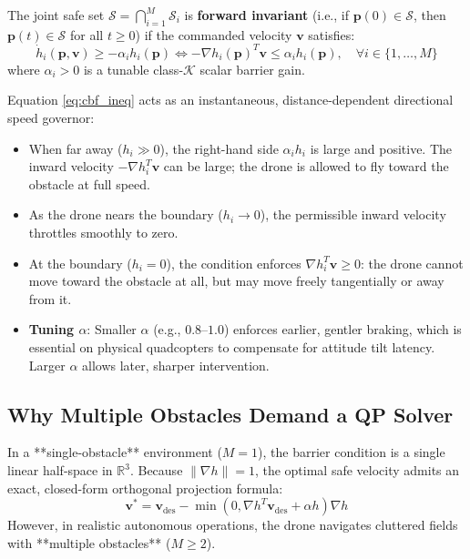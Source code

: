 \documentclass[11pt,a4paper]{article}
\begin{document}
\begin{definitionbox}
The joint safe set $\mathcal{S} = \bigcap_{i=1}^M \mathcal{S}_i$ is \textbf{forward invariant} (i.e., if $\mathbf{p}(0) \in \mathcal{S}$, then $\mathbf{p}(t) \in \mathcal{S}$ for all $t \ge 0$) if the commanded velocity $\mathbf{v}$ satisfies:
\begin{equation}
\dot{h}_i(\mathbf{p}, \mathbf{v}) \ge -\alpha_i h_i(\mathbf{p}) \iff -\nabla h_i(\mathbf{p})^T \mathbf{v} \le \alpha_i h_i(\mathbf{p}), \quad \forall i \in \{1, \dots, M\}
\label{eq:cbf_ineq}
\end{equation}
where $\alpha_i > 0$ is a tunable class-$\mathcal{K}$ scalar barrier gain.
\end{definitionbox}

\begin{intuitionbox}
Equation \eqref{eq:cbf_ineq} acts as an instantaneous, distance-dependent directional speed governor:
\begin{itemize}
    \item When far away ($h_i \gg 0$), the right-hand side $\alpha_i h_i$ is large and positive. The inward velocity $-\nabla h_i^T \mathbf{v}$ can be large; the drone is allowed to fly toward the obstacle at full speed.
    \item As the drone nears the boundary ($h_i \to 0$), the permissible inward velocity throttles smoothly to zero.
    \item At the boundary ($h_i = 0$), the condition enforces $\nabla h_i^T \mathbf{v} \ge 0$: the drone cannot move toward the obstacle at all, but may move freely tangentially or away from it.
    \item \textbf{Tuning $\alpha$}: Smaller $\alpha$ (e.g., $0.8\text{--}1.0$) enforces earlier, gentler braking, which is essential on physical quadcopters to compensate for attitude tilt latency. Larger $\alpha$ allows later, sharper intervention.
\end{itemize}
\end{intuitionbox}

\subsection{Why Multiple Obstacles Demand a QP Solver}
In a **single-obstacle** environment ($M = 1$), the barrier condition is a single linear half-space in $\mathbb{R}^3$. Because $\|\nabla h\| = 1$, the optimal safe velocity admits an exact, closed-form orthogonal projection formula:
\begin{equation}
\mathbf{v}^* = \mathbf{v}_{\mathrm{des}} - \min\left(0, \nabla h^T \mathbf{v}_{\mathrm{des}} + \alpha h\right) \nabla h
\end{equation}
However, in realistic autonomous operations, the drone navigates cluttered fields with **multiple obstacles** ($M \ge 2$). 
\end{document}
